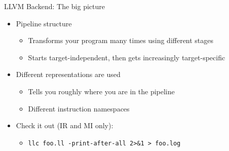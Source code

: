 
\begin{frame}{LLVM Backend: The big picture}

\begin{itemize}
    \item Pipeline structure
    \begin{itemize}
        \item Transforms your program many times using different stages
        \item Starts target-independent, then gets increasingly target-specific
    \end{itemize}
    \item Different representations are used
    \begin{itemize}
        \item Tells you roughly where you are in the pipeline
        \item Different instruction namespaces
    \end{itemize}
    \item Check it out (IR and MI only):
    \begin{itemize}
        \item \texttt{llc foo.ll -print-after-all 2>\&1 > foo.log}
    \end{itemize}
\end{itemize}


\end{frame}


